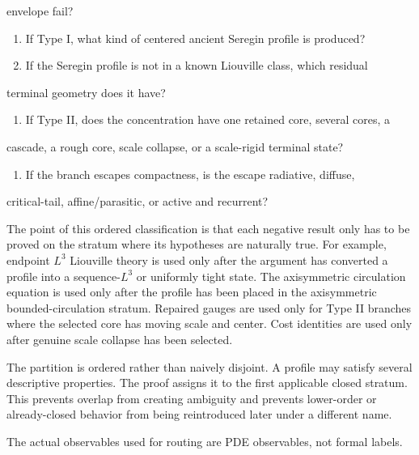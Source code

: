 \documentclass[11pt]{amsart}
\begin{document}
envelope fail?

\begin{enumerate}
\item If Type I, what kind of centered ancient Seregin profile is produced?
\item If the Seregin profile is not in a known Liouville class, which residual
\end{enumerate}

terminal geometry does it have?

\begin{enumerate}
\item If Type II, does the concentration have one retained core, several cores, a
\end{enumerate}

cascade, a rough core, scale collapse, or a scale-rigid terminal state?

\begin{enumerate}
\item If the branch escapes compactness, is the escape radiative, diffuse,
\end{enumerate}

critical-tail, affine/parasitic, or active and recurrent?

The point of this ordered classification is that each negative result only has to be proved on the stratum where its hypotheses are naturally true.  For example, endpoint \(L^3\) Liouville theory is used only after the argument has converted a profile into a sequence-\(L^3\) or uniformly tight state.  The axisymmetric circulation equation is used only after the profile has been placed in the axisymmetric bounded-circulation stratum.  Repaired gauges are used only for Type II branches where the selected core has moving scale and center.  Cost identities are used only after genuine scale collapse has been selected.

The partition is ordered rather than naively disjoint.  A profile may satisfy several descriptive properties.  The proof assigns it to the first applicable closed stratum.  This prevents overlap from creating ambiguity and prevents lower-order or already-closed behavior from being reintroduced later under a different name.

The actual observables used for routing are PDE observables, not formal labels.
\end{document}

